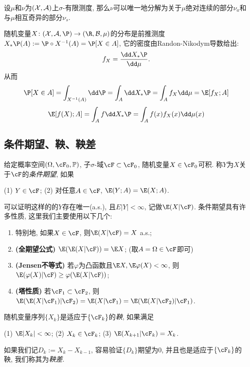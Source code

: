 \begin{theorem}[Lebesgue分解定理]
	设$\mu$和$\nu$为$(\mathcal{X}, \mathcal{A})$上$\sigma$-有限测度, 那么$\nu$可以唯一地分解为关于$\mu$绝对连续的部分$\nu_a$和与$\mu$相互奇异的部分$\nu_s$. 
\end{theorem}

\begin{example}[分布的密度]
	随机变量$X \colon (\cX, \cA, \P) \to (\R, \cB, \mu)$的分布是前推测度$X_* \P (A) := \P \circ X^{-1} (A) = \P[X \in A]$, 它的密度由Randon-Nikodym导数给出: 
	\begin{equation*}
		f_X = \frac{\dd X_* \P}{\dd \mu}. 
	\end{equation*}
	从而
	\begin{equation*}
		\P[X \in A] 
		= \int_{X^{-1}(A)} \dd \P 
		= \int_A \dd X_* \P 
		= \int_A f_X \dd \mu
		= \E[f_X; A]
	\end{equation*}
	\begin{equation*}
		\E[f(X); A]
		= \int_A f \dd X_* \P 
		= \int_A f(x) f_X(x) \dd \mu(x)
	\end{equation*}
\end{example}

\subsection{条件期望、鞅、鞅差}

给定概率空间$(\Omega, \cF_0, \mathbb{P})$, 子$\sigma$-域$\cF \subset \cF_0$, 随机变量$X \in \cF_0$可积. 
称$Y$为$X$关于$\cF$的\emph{条件期望}, 如果
\begin{center}
	(1) $Y \in \cF$; \quad
	(2) 对任意$A \in \cF$, $\E(Y;A) = \E(X;A)$. 
\end{center}
可以证明这样的的$Y$存在唯一(a.s.), 且$E|Y| < \infty$, 记做$\E(X|\cF)$. 
条件期望具有许多性质, 这里我们主要使用以下几个: 
	\begin{enumerate}[label=(\roman*)]
		\item 特别地, 如果$X \in \cF$, 则$\E(X|\cF) = X$ a.s.;
		\item \textbf{(全期望公式)} $\E(\E(X|\cF)) = \E X$; (取$A = \Omega \in \cF$即可)
		\item \textbf{(Jensen不等式)} 若$\varphi$为凸函数且$\E X, \E \varphi(X) < \infty$, 则$\E(\varphi(X) | \cF) \geq \varphi(\E(X|\cF))$; 
		\item \textbf{(塔性质)} 若$\cF_1 \subset \cF_2$, 则$\E(\E(X|\cF_1)|\cF_2) = \E(X|\cF_1) = \E(\E(X|\cF_2)|\cF_1)$. 
	\end{enumerate}
随机变量序列$\{X_k\}$是适应于$\{\cF_k\}$的\emph{鞅}, 如果满足
\begin{center}
	(1) $\E |X_k| < \infty$; \quad
	(2) $X_k \in \cF_k$; \quad
	(3) $\E(X_{k+1}|\cF_k) = X_k$.
\end{center}
如果我们记$D_k := X_k - X_{k-1}$, 容易验证$\{D_k\}$期望为$0$, 并且也是适应于$\{\cF_k\}$的鞅, 我们称其为\emph{鞅差}. 

